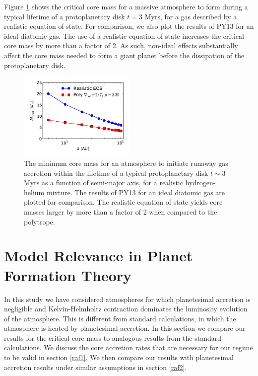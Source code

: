 \documentclass[apj]{emulateapj}
\begin{document}


Figure \ref{fig:Mvsaplot} shows the critical core mass for a massive atmosphere to form during a typical lifetime of a protoplanetary disk $t=3$ Myrs, for a gas described by a realistic equation of state. For comparison, we also plot the results of PY13 for an ideal diatomic gas. The use of a realistic equation of state increases the critical core mass by more than a factor of 2. As such, non-ideal effects substantially affect the core mass needed to form a giant planet  before the dissipation of the protoplanetary disk.   

\begin{figure}[h!]
\centering
\includegraphics[width=0.5\textwidth]{../../figs/ModelAtmospheres/RadSelfGravRealEOS/Mc_vs_a_poly_real_paper.pdf}
\caption{The minimum core mass for an atmosphere to initiate runaway gas accretion within the lifetime of a typical protoplanetary disk $t \sim 3$ Myrs as a function of semi-major axis, for a realistic hydrogen-helium mixture. The results of PY13 for an ideal diatomic gas are plotted for comparison. The realistic equation of state yields core masses larger by more than a factor of 2 when compared to the polytrope.}
\label{fig:Mvsaplot}
\end{figure}


\section{Model Relevance in Planet Formation Theory}
\label{acc}

In this study we have considered atmospheres for which planetesimal accretion is negligible and Kelvin-Helmholtz contraction dominates the luminosity evolution of the atmosphere. This is different from standard calculations, in which the atmosphere is heated by planetesimal accretion. In this section we compare our results for the critical core mass to analogous results from the standard calculations. We discuss the core accretion rates that are necessary for our regime to be valid in section \ref{raf1}. We then compare our results with planetesimal accretion results under similar assumptions in section \ref{raf2}.
\end{document}
